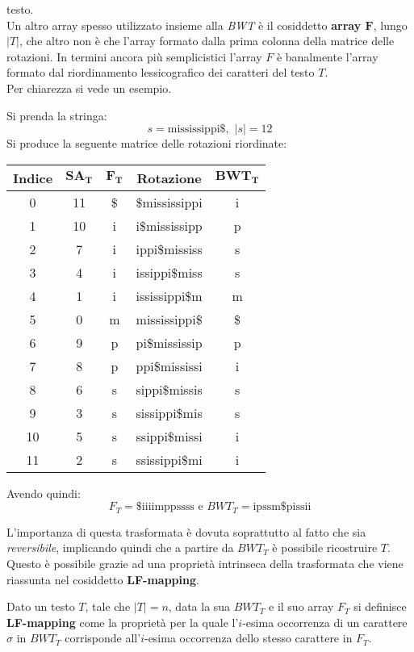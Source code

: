 testo.\\
Un altro array spesso utilizzato insieme alla \textit{BWT} è il cosiddetto
\textbf{array $\mathbf{F}$}, lungo $|T|$, che altro non è che l'array formato
dalla prima colonna della matrice delle rotazioni. In termini ancora più
semplicistici l'array $F$ è banalmente l'array formato dal riordinamento
lessicografico dei caratteri del testo $T$.\\
Per chiarezza si vede un esempio. 
\begin{esempio}
   Si prenda la stringa:
  \[s=\mbox{mississippi\$},\,\,|s|=12\]
  Si produce la seguente matrice delle rotazioni riordinate:
  \begin{table}[H]
    \centering
    \footnotesize
    \begin{tabular}{c|c|c|c|c} 
      \textbf{Indice} & $\mathbf{SA_T}$ & $\mathbf{F_T}$ & \textbf{Rotazione}
      & $\mathbf{BWT_T}$\\ 
      \hline
      0 & 11 & \$ & \$mississippi & i\\
      1 & 10 & i & i\$mississipp & p\\
      2 & 7 & i & ippi\$mississ & s\\
      3 & 4 & i & issippi\$miss & s\\
      4 & 1 & i & ississippi\$m & m\\
      5 & 0 & m & mississippi\$ & \$\\
      6 & 9 & p & pi\$mississip & p\\
      7 & 8 & p & ppi\$mississi & i\\
      8 & 6 & s & sippi\$missis & s\\
      9 & 3 & s & sissippi\$mis & s\\
      10 & 5 & s & ssippi\$missi & i\\
      11 & 2 & s & ssissippi\$mi & i\\
    \end{tabular}
  \end{table}
  Avendo quindi:
  \[F_T=\mbox{\$iiiimppssss}\mbox{ e }BWT_T=\mbox{ipssm\$pissii}\]
\end{esempio}
L'importanza di questa trasformata è dovuta soprattutto al fatto che sia
\textit{reversibile}, implicando quindi che a partire da $BWT_T$ è possibile
ricostruire $T$. Questo è possibile grazie ad una proprietà intrinseca della
trasformata che viene riassunta nel cosiddetto \textbf{LF-mapping}.
\begin{definizione}
  Dato un testo $T$, tale che $|T|=n$, data la sua $BWT_T$ e il suo array $F_T$
  si definisce \textbf{LF-mapping} come la proprietà per la quale l'$i$-esima
  occorrenza di un carattere $\sigma$ in $BWT_T$ corrisponde all'$i$-esima
  occorrenza dello stesso carattere in $F_T$.
\end{definizione}
